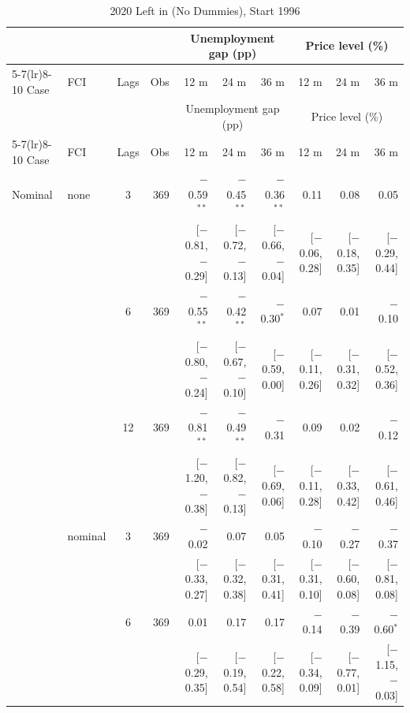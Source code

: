 \begingroup\scriptsize\setlength{\tabcolsep}{0.9pt}
\begin{longtable}{llcrrrrrrr}
\caption{2020 Left in (No Dummies), Start 1996}\label{tab:appR1a}\\
\toprule
 & & & & \multicolumn{3}{c}{Unemployment gap (pp)} & \multicolumn{3}{c}{Price level (\%)}\\ \cmidrule(lr){5-7}\cmidrule(lr){8-10}
Case & FCI & Lags & Obs & 12 m & 24 m & 36 m & 12 m & 24 m & 36 m\\
\midrule\endfirsthead
\toprule
 & & & & \multicolumn{3}{c}{Unemployment gap (pp)} & \multicolumn{3}{c}{Price level (\%)}\\ \cmidrule(lr){5-7}\cmidrule(lr){8-10}
Case & FCI & Lags & Obs & 12 m & 24 m & 36 m & 12 m & 24 m & 36 m\\
\midrule\endhead
\bottomrule\endfoot
Nominal & none & 3 & 369 & $-$0.59$^{**}$ & $-$0.45$^{**}$ & $-$0.36$^{**}$ & 0.11 & 0.08 & 0.05\\
 & & & & {\scriptsize [$-$0.81, $-$0.29]} & {\scriptsize [$-$0.72, $-$0.13]} & {\scriptsize [$-$0.66, $-$0.04]} & {\scriptsize [$-$0.06, 0.28]} & {\scriptsize [$-$0.18, 0.35]} & {\scriptsize [$-$0.29, 0.44]}\\
 &  & 6 & 369 & $-$0.55$^{**}$ & $-$0.42$^{**}$ & $-$0.30$^{*}$ & 0.07 & 0.01 & $-$0.10\\
 & & & & {\scriptsize [$-$0.80, $-$0.24]} & {\scriptsize [$-$0.67, $-$0.10]} & {\scriptsize [$-$0.59, 0.00]} & {\scriptsize [$-$0.11, 0.26]} & {\scriptsize [$-$0.31, 0.32]} & {\scriptsize [$-$0.52, 0.36]}\\
 &  & 12 & 369 & $-$0.81$^{**}$ & $-$0.49$^{**}$ & $-$0.31 & 0.09 & 0.02 & $-$0.12\\
 & & & & {\scriptsize [$-$1.20, $-$0.38]} & {\scriptsize [$-$0.82, $-$0.13]} & {\scriptsize [$-$0.69, 0.06]} & {\scriptsize [$-$0.11, 0.28]} & {\scriptsize [$-$0.33, 0.42]} & {\scriptsize [$-$0.61, 0.46]}\\
 & nominal & 3 & 369 & $-$0.02 & 0.07 & 0.05 & $-$0.10 & $-$0.27 & $-$0.37\\
 & & & & {\scriptsize [$-$0.33, 0.27]} & {\scriptsize [$-$0.32, 0.38]} & {\scriptsize [$-$0.31, 0.41]} & {\scriptsize [$-$0.31, 0.10]} & {\scriptsize [$-$0.60, 0.08]} & {\scriptsize [$-$0.81, 0.08]}\\
 &  & 6 & 369 & 0.01 & 0.17 & 0.17 & $-$0.14 & $-$0.39 & $-$0.60$^{*}$\\
 & & & & {\scriptsize [$-$0.29, 0.35]} & {\scriptsize [$-$0.19, 0.54]} & {\scriptsize [$-$0.22, 0.58]} & {\scriptsize [$-$0.34, 0.09]} & {\scriptsize [$-$0.77, 0.01]} & {\scriptsize [$-$1.15, $-$0.03]}\\

\end{longtable}
